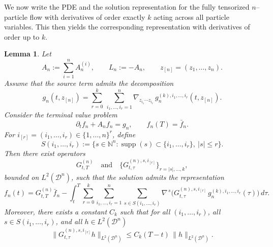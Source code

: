 \documentclass[pdflatex,sn-mathphys-num]{sn-jnl}
\theoremstyle{thmstyleone}%
\theoremstyle{thmstyletwo}%
\theoremstyle{thmstylethree}%
\newtheorem{lemma}{Lemma}
\begin{document}
We now write the PDE and the solution representation for the fully tensorized $n$--particle flow with derivatives of order exactly $k$ acting across all particle variables. This then yields the corresponding representation with derivatives of order up to $k$.
%
\begin{lemma}
\label{lem:tensor_all_derivatives}
Let
\[
A_n:=\sum_{i=1}^n A_n^{(i)}, \qquad L_n:=-A_n,
\qquad
z_{[n]}=(z_1,\dots,z_n).
\]
Assume that the source term admits the decomposition
\[
g_n(t,z_{[n]})
=
\sum_{r=0}^k \ \sum_{i_1,\dots,i_r=1}^n
\nabla_{z_{i_1}\cdots z_{i_r}}\,
g_n^{(k),i_1,\dots,i_r}(t,z_{[n]}).
\]
Consider the terminal value problem
\[
\partial_t f_n + A_n f_n = g_n,
\qquad
f_n(T)=\bar f_n.
\]
For $i_{[r]}=(i_1,\dots,i_r)\in\{1,\dots,n\}^r$, define
\[
S(i_1,\dots,i_r)
:=
\Big\{
s\in\mathbb{N}^n :
\operatorname{supp}(s)\subset \{i_1,\dots,i_r\},
\ |s|\le r
\Big\}.
\]
Then there exist operators
\[
G^{(n)}_{t,T}
\quad\text{and}\quad
\big\{ G^{(n),s,i_{[r]}}_{t,\tau} \big\}_{r=|s|,\dots,k},
\]
bounded on $L^2(\mathcal D^n)$, such that the solution admits the representation
\[
f_n(t)
=
G^{(n)}_{t,T}\bar f_n
-
\int_t^T
\sum_{r=0}^k
\sum_{i_1,\dots,i_r=1}^n
\sum_{s\in S(i_1,\dots,i_r)}
\nabla^{\,s}\Big(
G^{(n),s,i_{[r]}}_{t,\tau}\,
g_n^{(k),i_1,\dots,i_r}(\tau)
\Big)\,d\tau.
\]
Moreover, there exists a constant
$C_k$ such that for all $(i_1,\dots,i_r)$, all
$s\in S(i_1,\dots,i_r)$, and all $h\in L^2(\mathcal D^n)$
\begin{equation}\label{Operators_bound_tensorized}
\|G^{(n),s,i_{[r]}}_{t,\tau} h\|_{L^2(\mathcal D^n)}
\le C_k(T-t)\,\|h\|_{L^2(\mathcal D^n)}.
\end{equation}
\end{lemma}
\end{document}
